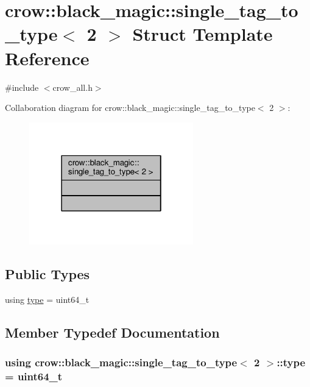 \hypertarget{structcrow_1_1black__magic_1_1single__tag__to__type_3_012_01_4}{\section{crow\-:\-:black\-\_\-magic\-:\-:single\-\_\-tag\-\_\-to\-\_\-type$<$ 2 $>$ Struct Template Reference}
\label{structcrow_1_1black__magic_1_1single__tag__to__type_3_012_01_4}
}


{\ttfamily \#include $<$crow\-\_\-all.\-h$>$}



Collaboration diagram for crow\-:\-:black\-\_\-magic\-:\-:single\-\_\-tag\-\_\-to\-\_\-type$<$ 2 $>$\-:
\nopagebreak
\begin{figure}[H]
\begin{center}
\leavevmode
\includegraphics[width=202pt]{structcrow_1_1black__magic_1_1single__tag__to__type_3_012_01_4__coll__graph}
\end{center}
\end{figure}
\subsection*{Public Types}
\begin{DoxyCompactItemize}
\item 
using \hyperlink{structcrow_1_1black__magic_1_1single__tag__to__type_3_012_01_4_a15baed3b24a95d315e25de0a1fea6763}{type} = uint64\-\_\-t
\end{DoxyCompactItemize}


\subsection{Member Typedef Documentation}
\hypertarget{structcrow_1_1black__magic_1_1single__tag__to__type_3_012_01_4_a15baed3b24a95d315e25de0a1fea6763}{
\subsubsection[{type}]{\setlength{\rightskip}{0pt plus 5cm}using {\bf crow\-::black\-\_\-magic\-::single\-\_\-tag\-\_\-to\-\_\-type}$<$ 2 $>$\-::{\bf type} =  uint64\-\_\-t}}\label{structcrow_1_1black__magic_1_1single__tag__to__type_3_012_01_4_a15baed3b24a95d315e25de0a1fea6763}


